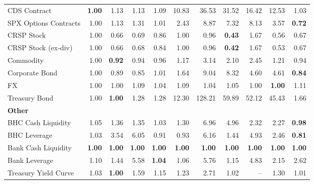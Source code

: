 \begin{table}[htbp]
\begin{tabular}{@{}lrrrrrrrrrr@{}}
CDS Contract & \textbf{1.00} & 1.13 & 1.13 & 1.09 & 10.83 & 36.53 & 31.52 & 16.42 & 12.53 & 1.03 \\
SPX Options Contracts & 1.00 & 1.13 & 1.31 & 1.01 & 2.43 & 8.87 & 7.32 & 8.13 & 3.57 & \textbf{0.72} \\
CRSP Stock & 1.00 & 0.66 & 0.69 & 0.86 & 1.00 & 0.96 & \textbf{0.43} & 1.67 & 0.56 & 0.67 \\
CRSP Stock (ex-div) & 1.00 & 0.66 & 0.68 & 0.84 & 1.00 & 0.96 & \textbf{0.42} & 1.67 & 0.53 & 0.67 \\
Commodity & 1.00 & \textbf{0.92} & 0.94 & 0.96 & 1.17 & 3.14 & 2.10 & 2.45 & 1.21 & 0.94 \\
Corporate Bond & 1.00 & 0.89 & 0.85 & 1.01 & 1.64 & 9.04 & 8.32 & 4.60 & 4.61 & \textbf{0.84} \\
FX & 1.00 & 1.00 & 1.09 & 1.04 & 1.09 & 1.04 & 1.05 & 1.00 & \textbf{1.00} & 1.11 \\
Treasury Bond & 1.00 & \textbf{1.00} & 1.28 & 1.28 & 12.30 & 128.21 & 59.89 & 52.12 & 45.43 & 1.66 \\
\midrule
\multicolumn{11}{l}{\textbf{Other}} \\
BHC Cash Liquidity & 1.05 & 1.36 & 1.35 & 1.03 & 1.30 & 6.96 & 4.96 & 2.32 & 2.27 & \textbf{0.98} \\
BHC Leverage & 1.03 & 3.54 & 6.05 & 0.91 & 0.93 & 6.16 & 1.44 & 4.93 & 2.46 & \textbf{0.81} \\
Bank Cash Liquidity & \textbf{1.00} & \textbf{1.00} & \textbf{1.00} & \textbf{1.00} & \textbf{1.00} & \textbf{1.00} & \textbf{1.00} & \textbf{1.00} & \textbf{1.00} & \textbf{1.00} \\
Bank Leverage & 1.10 & 1.44 & 5.58 & \textbf{1.04} & 1.06 & 5.76 & 1.15 & 4.83 & 2.15 & 2.62 \\
Treasury Yield Curve & 1.03 & \textbf{1.00} & 1.59 & 1.15 & 1.23 & 2.71 & 1.02 & -- & 1.30 & 1.01 \\
\bottomrule
\end{tabular}
\vspace{0.1cm}

\end{table}
